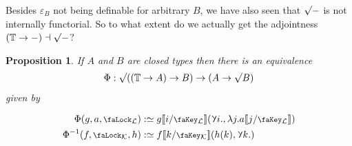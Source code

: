 \documentclass[10pt]{article}
\newtheorem{proposition}[theorem]{Proposition}
\theoremstyle{definition}
\let\oldequiv\equiv%
\renewcommand{\equiv}{\simeq}
\newcommand{\defeq}{\oldequiv}
\newcommand{\lock}{\mathchoice {\scalebox{0.8}{\text{\faLock}}}
  {\scalebox{0.8}{\text{\faLock}}} {\scalebox{0.5}{\text{\faLock}}}
  {\scalebox{0.4}{\text{\faLock}}} }
\newcommand{\key}{\mathchoice
  {\scalebox{0.8}{\text{\faKey}}} {\scalebox{0.8}{\text{\faKey}}}
  {\scalebox{0.5}{\text{\faKey}}} {\scalebox{0.4}{\text{\faKey}}} }
\newcommand{\rbindsym}{\raisebox{-0.5pt}{\scalerel*{\reflectbox{\rotatebox[origin=c]{185}{$\lambda$}}}{\lambda}}}
\newcommand{\rbind}[1]{\rbindsym{} #1.}
\newcommand{\Tiny}{\mathbb{T}}
\newcommand{\lockn}[1]{\mathcal{#1}}
\newcommand{\varkeye}[2]{\key_{#1}^{#2}}
\newcommand{\varkey}[2]{\varkeye{\lockn{#1}}{#2}}
\newcommand{\ctxlocke}[1]{\lock_{#1}}
\newcommand{\ctxlock}[1]{\ctxlocke{\lockn{#1}}}
\newcommand{\stubra}[1]{\llbracket #1 \rrbracket}
\newcommand{\substucke}[2]{\stubra{#1/\key_{#2}}}
\newcommand{\substuck}[2]{\substucke{#1}{\lockn{#2}}}
\newcommand{\rformsym}{\surd}
\newcommand{\rformu}[1]{\ThisStyle{\raisebox{0.07em}{$\SavedStyle \rformsym$}} #1}
\newcommand{\rintroe}[2]{\lock_{#1}. #2}
\newcommand{\rintro}[2]{\rintroe{\lockn{#1}}{#2}}
\newcommand{\relim}[1]{\rbindsym #1}
\newcommand{\rget}[1]{{#1}_{\downharpoonleft}}
\begin{document}
Besides $\varepsilon_B$ not being definable for arbitrary $B$, we have
also seen that $\rformu -$ is not internally functorial. So to what
extent do we actually get the adjointness $(\Tiny \to -) \dashv \rformu -$?
\begin{proposition}
  If $A$ and $B$ are closed types then there is an equivalence
  \begin{align*}
    \Phi : \rformu ((\Tiny \to A) \to B) \to (A \to \rformu B)
  \end{align*}
  given by

  \begin{alignat*}{2}
    \Phi(g, a, \ctxlock{L})
    &:\defeq g\substuck{i}{L}(\rbind{i}, \lambda j. a \substuck{j}{L}) \\
    \Phi^{-1}(f, \ctxlock{K}, h)
    &:\defeq f\substuck{k}{K}(h(k), \rbind{k})
  \end{alignat*}
\end{proposition}
\end{document}
